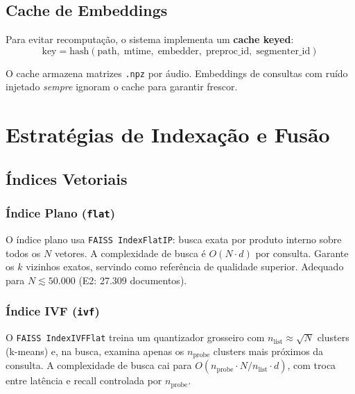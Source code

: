 \documentclass[12pt,a4paper]{article}
\begin{document}
\subsection{Cache de Embeddings}

Para evitar recomputação, o sistema implementa um \textbf{cache keyed}:
\begin{equation}
  \text{key} = \text{hash}(\text{path},\; \text{mtime},\; \text{embedder},\;
                            \text{preproc\_id},\; \text{segmenter\_id})
  \label{eq:cachekey}
\end{equation}

O cache armazena matrizes \texttt{.npz} por áudio. Embeddings de consultas
com ruído injetado \emph{sempre} ignoram o cache para garantir frescor.

\section{Estratégias de Indexação e Fusão}
\label{sec:indexacao}

\subsection{Índices Vetoriais}

\subsubsection{Índice Plano (\texttt{flat})}

O índice plano usa \texttt{FAISS IndexFlatIP}: busca exata por produto interno
sobre todos os $N$ vetores. A complexidade de busca é $O(N \cdot d)$ por
consulta. Garante os $k$ vizinhos exatos, servindo como referência de qualidade
superior. Adequado para $N \lesssim 50.000$ (E2: 27.309 documentos).

\subsubsection{Índice IVF (\texttt{ivf})}

O \texttt{FAISS IndexIVFFlat} treina um quantizador grosseiro com $n_{\text{list}}
\approx \sqrt{N}$ clusters (k-means) e, na busca, examina apenas os
$n_{\text{probe}}$ clusters mais próximos da consulta. A complexidade de busca
cai para $O(n_{\text{probe}} \cdot N/n_{\text{list}} \cdot d)$, com troca
entre latência e recall controlada por $n_{\text{probe}}$.
\end{document}
